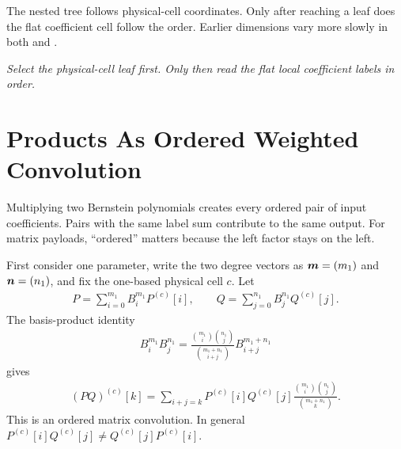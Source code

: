 The nested tree  follows physical-cell coordinates. Only after reaching a leaf does the flat coefficient cell follow the  order.  Earlier dimensions vary more slowly in both  and .

\begin{center}

\textit{Select the physical-cell leaf first. Only then read the flat local coefficient labels in  order.}
\end{center}

\section{Products As Ordered Weighted Convolution}
\label{sec:bernstein-product-math}

Multiplying two Bernstein polynomials creates every ordered pair of input coefficients. Pairs with the same label sum contribute to the same output. For matrix payloads, ``ordered'' matters because the left factor stays on the left.

First consider one parameter, write the two degree vectors as $\boldsymbol{m}=(m_1)$ and $\boldsymbol{n}=(n_1)$, and fix the one-based physical cell $c$. Let
\begin{gather*}
P=\sum_{i=0}^{m_1}B_i^{m_1}P^{(c)}[i],\qquad Q=\sum_{j=0}^{n_1}B_j^{n_1}Q^{(c)}[j].
\end{gather*}
The basis-product identity
\begin{gather*}
B_i^{m_1}B_j^{n_1}=
  \frac{\binom{m_1}{i}\binom{n_1}{j}}{\binom{m_1+n_1}{i+j}}B_{i+j}^{m_1+n_1}
\end{gather*}
gives
\begin{gather*}
(PQ)^{(c)}[k]=\sum_{i+j=k}P^{(c)}[i]Q^{(c)}[j]
  \frac{\binom{m_1}{i}\binom{n_1}{j}}{\binom{m_1+n_1}{k}}.
\end{gather*}
This is an ordered matrix convolution.  In general $P^{(c)}[i]Q^{(c)}[j]\ne Q^{(c)}[j]P^{(c)}[i]$.


